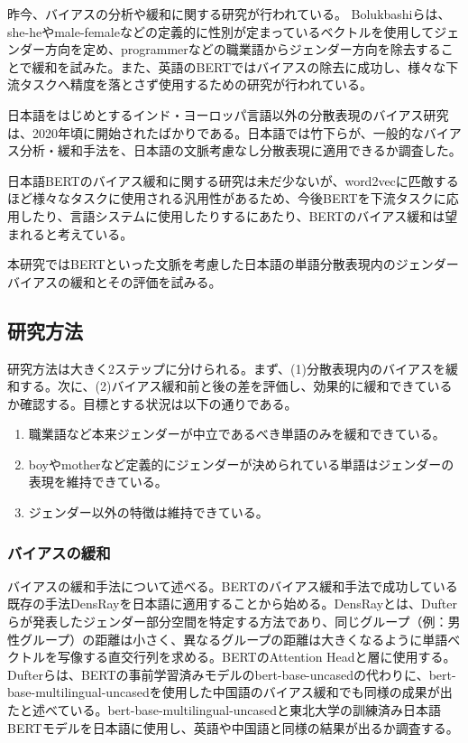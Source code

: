 \documentclass[a4j,10pt, twocolumn]{jarticle} \usepackage[dvipdfmx]{graphicx} \usepackage{amssymb} \usepackage{amsmath}
\begin{document}
昨今、バイアスの分析や緩和に関する研究が行われている。
Bolukbashiらは、she-heやmale-femaleなどの定義的に性別が定まっているベクトルを使用してジェンダー方向を定め、programmerなどの職業語からジェンダー方向を除去することで緩和を試みた\cite{Bolukbasi}。また、英語のBERTではバイアスの除去に成功し、様々な下流タスクへ精度を落とさず使用するための研究が行われている\cite{P P Liang}。

日本語をはじめとするインド・ヨーロッパ言語以外の分散表現のバイアス研究は、2020年頃に開始されたばかりである\cite{Takeshita}。日本語では竹下らが、一般的なバイアス分析・緩和手法を、日本語の文脈考慮なし分散表現に適用できるか調査した\cite{Takeshita}。

日本語BERTのバイアス緩和に関する研究は未だ少ないが、word2vecに匹敵するほど様々なタスクに使用される汎用性があるため、今後BERTを下流タスクに応用したり、言語システムに使用したりするにあたり、BERTのバイアス緩和は望まれると考えている。

本研究ではBERTといった文脈を考慮した日本語の単語分散表現内のジェンダーバイアスの緩和とその評価を試みる。

\subsection{研究方法}
研究方法は大きく2ステップに分けられる。まず、(1)分散表現内のバイアスを緩和する。次に、(2)バイアス緩和前と後の差を評価し、効果的に緩和できているか確認する。目標とする状況は以下の通りである。
\begin{enumerate}
   \item 職業語など本来ジェンダーが中立であるべき単語のみを緩和できている。
   \item boyやmotherなど定義的にジェンダーが決められている単語はジェンダーの表現を維持できている。
   \item ジェンダー以外の特徴は維持できている。
\end{enumerate}
\subsubsection{バイアスの緩和}
バイアスの緩和手法について述べる。BERTのバイアス緩和手法で成功している既存の手法DensRay\cite{Liang}を日本語に適用することから始める。DensRayとは、Dufterらが発表したジェンダー部分空間を特定する方法であり、同じグループ（例：男性グループ）の距離は小さく、異なるグループの距離は大きくなるように単語ベクトルを写像する直交行列を求める\cite{Dufter, Liang}。BERTのAttention Headと層に使用する。Dufterらは、BERTの事前学習済みモデルのbert-base-uncasedの代わりに、bert-base-multilingual-uncasedを使用した中国語のバイアス緩和でも同様の成果が出たと述べている。bert-base-multilingual-uncasedと東北大学の訓練済み日本語BERTモデルを日本語に使用し、英語や中国語と同様の結果が出るか調査する。
\end{document}

